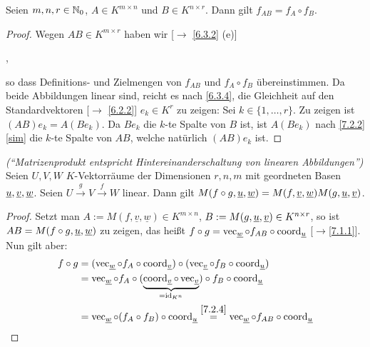 \documentclass[../../main.tex]{subfiles}
\begin{document}
\begin{lem}\label{7.2.4}
Seien $m,n,r\in\mathbb N_0$, $A\in K^{m\times n}$ und $B\in K^{n\times r}$. Dann gilt $f_{AB}=f_A\circ f_B$.
\end{lem}

\begin{proof}
Wegen $AB\in K^{m\times r}$ haben wir [$\to$ \ref{6.3.2} (e)]
\begin{center}
,
\end{center}
so dass Definitions- und Zielmengen von $f_{AB}$ und $f_A\circ f_B$ übereinstimmen.
Da beide Abbildungen linear sind, reicht es nach \ref{6.3.4}, die Gleichheit auf den Standardvektoren [$\to$ \ref{6.2.2}]
$e_k\in K^r$ zu zeigen: Sei $k\in\{1,\dots,r\}$. Zu zeigen ist $(AB)e_k=A(Be_k)$. Da $Be_k$ die $k$-te Spalte von $B$ ist, ist $A(Be_k)$ nach \ref{7.2.2}\eqref{sim}
die $k$-te Spalte von $AB$, welche natürlich $(AB)e_k$ ist. 
\end{proof}

\begin{sat}\emph{("`Matrizenprodukt entspricht Hintereinanderschaltung von linearen Abbildungen"')}\label{7.2.5}
Seien $U,V,W$ $K$-Vektorräume der Dimensionen $r,n,m$ mit geordneten Basen ${\underline u},{\underline v},{\underline w}$. Seien
$U\overset g\longrightarrow V\overset f\longrightarrow W$ linear. Dann gilt $M(f\circ g,{\underline u},{\underline w})=M(f,{\underline v},{\underline w})M(g,{\underline u},{\underline v})$.
\end{sat}

\begin{proof}
Setzt man $A:=M(f,\underline v,\underline w)\in K^{m\times n}$, $B:=M(g,{\underline u},{\underline v})\in K^{n\times r}$, so ist $AB=M(f\circ g,{\underline u},{\underline w})$ zu zeigen, das heißt
$f\circ g=\operatorname{vec}_{{\underline w}}\circ f_{AB}\circ\operatorname{coord}_{\underline u}$ [$\to$\ref{7.1.1}]. Nun gilt aber:
\begin{align*}
f\circ g&=(\operatorname{vec}_{\underline w}\circ f_A\circ\operatorname{coord}_{\underline v})\circ(\operatorname{vec}_{\underline v}\circ f_B\circ\operatorname{coord}_{\underline u})\\
&=\operatorname{vec}_{\underline w}\circ f_A\circ(\underbrace{\operatorname{coord}_{\underline v}\circ\operatorname{vec}_{\underline v}}_{=\operatorname{id}_{K^n}})\circ f_B\circ\operatorname{coord}_{\underline u}\\
&=\operatorname{vec}_{\underline w}\circ(f_A\circ f_B)\circ\operatorname{coord}_{\underline u}\overset{\ref{7.2.4}}=\operatorname{vec}_{\underline w}\circ f_{AB}\circ\operatorname{coord}_{\underline u}
\end{align*}
\end{proof}
\end{document}
